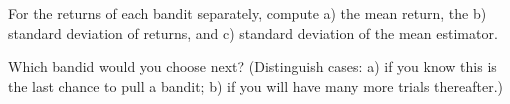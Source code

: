 For the returns of each bandit separately, compute a) the mean return,
the b) standard deviation of returns, and c) standard deviation of the
mean estimator.

Which bandid would you choose next? (Distinguish cases: a) if you know
this is the last chance to pull a bandit; b) if you will have many
more trials thereafter.)


\exerfoot
